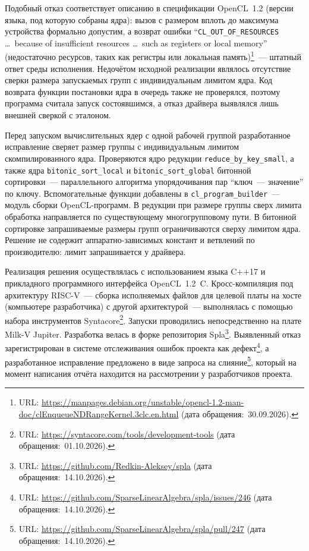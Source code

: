 \documentclass[a4paper]{article}
\begin{document}
Подобный отказ соответствует описанию в спецификации OpenCL~1.2 (версии языка, под которую собраны ядра): вызов с размером вплоть до максимума устройства формально допустим, а возврат ошибки \foreignquote{english}{\texttt{CL\_OUT\_OF\_RESOURCES} \dots\ because of insufficient resources \dots\ such as registers or local memory} (недостаточно ресурсов, таких как регистры или локальная память)\footnote{URL: \url{https://manpages.debian.org/unstable/opencl-1.2-man-doc/clEnqueueNDRangeKernel.3clc.en.html} (дата обращения:~30.09.2026).}~--- штатный ответ среды исполнения. Недочётом исходной реализации являлось отсутствие сверки размера запускаемых групп с индивидуальным лимитом ядра. Код возврата функции постановки ядра в очередь также не проверялся, поэтому программа считала запуск состоявшимся, а отказ драйвера выявлялся лишь внешней сверкой с эталоном.

Перед запуском вычислительных ядер с одной рабочей группой разработанное исправление сверяет размер группы с индивидуальным лимитом скомпилированного ядра. Проверяются ядро редукции \texttt{reduce\_by\_key\_small}, а также ядра \texttt{bitonic\_sort\_local} и \texttt{bitonic\_sort\_global} битонной сортировки~--- параллельного алгоритма упорядочивания пар \enquote{ключ~--- значение} по ключу. Вспомогательные функции добавлены в \texttt{cl\_program\_builder}~--- модуль сборки OpenCL-программ. В редукции при размере группы сверх лимита обработка направляется по существующему многогрупповому пути. В битонной сортировке запрашиваемые размеры групп ограничиваются сверху лимитом ядра. Решение не содержит аппаратно-зависимых констант и ветвлений по производителю: лимит запрашивается у драйвера.

Реализация решения осуществлялась с использованием языка C++17 и прикладного программного интерфейса OpenCL~1.2~C. Кросс-компиляция под архитектуру RISC-V~--- сборка исполняемых файлов для целевой платы на хосте (компьютере разработчика) с другой архитектурой~--- выполнялась с помощью набора инструментов Syntacore\footnote{URL: \url{https://syntacore.com/tools/development-tools} (дата обращения:~01.10.2026).}. Запуски проводились непосредственно на плате Milk-V Jupiter. Разработка велась в форке репозитория Spla\footnote{URL: \url{https://github.com/Redkin-Aleksey/spla} (дата обращения:~14.10.2026).}. Выявленный отказ зарегистрирован в системе отслеживания ошибок проекта как дефект\footnote{URL: \url{https://github.com/SparseLinearAlgebra/spla/issues/246} (дата обращения:~14.10.2026).}, а разработанное исправление предложено в виде запроса на слияние\footnote{URL: \url{https://github.com/SparseLinearAlgebra/spla/pull/247} (дата обращения:~14.10.2026).}, который на момент написания отчёта находится на рассмотрении у разработчиков проекта.
\end{document}
